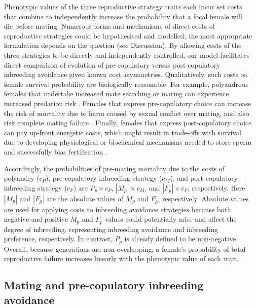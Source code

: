 \documentclass[12pt]{article}
\begin{document}
Phenotypic values of the three reproductive strategy traits each incur set costs that combine to independently increase the probability that a focal female will die before mating. Numerous forms and mechanisms of direct costs of reproductive strategies could be hypothesised and modelled; the most appropriate formulation depends on the question (see Discussion). By allowing costs of the three strategies to be directly and independently controlled, our model facilitates direct comparison of evolution of pre-copulatory versus post-copulatory inbreeding avoidance given known cost asymmetries. Qualitatively, such costs on female survival probability are biologically reasonable. For example, polyandrous females that undertake increased mate searching or mating can experience increased predation risk \cite[e.g.,][]{Rowe1988, Ronkainen1994, Koga1998}. Females that express pre-copulatory choice can increase the risk of mortality due to harm caused by sexual conflict over mating, and also risk complete mating failure \cite[which equates to pre-reproductive mortality in semelparous organisms;][]{Rowe1994, Kokko2013}. Finally, females that express post-copulatory choice can pay up-front energetic costs, which might result in trade-offs with survival due to developing physiological or biochemical mechanisms needed to store sperm and successfully bias fertilisation \cite[e.g.,][]{Gasparini2011, Tuni2013, Fitzpatrick2014a}.

Accordingly, the probabilities of pre-mating mortality due to the costs of polyandry ($c_{P}$), pre-copulatory inbreeding strategy ($c_{M}$), and post-copulatory inbreeding strategy ($c_{F}$) are $P_{p} \times c_{P}$, $|M_{p}| \times c_{M}$, and $|F_{p}| \times c_{F}$, respectively. Here $|M_{p}|$ and $|F_{p}|$ are the absolute values of $M_{p}$ and $F_{p}$, respectively. Absolute values are used for applying costs to inbreeding avoidance strategies because both negative and positive $M_{p}$ and $F_{p}$ values could potentially arise and affect the degree of inbreeding, representing inbreeding avoidance and inbreeding preference, respectively. In contrast, $P_{p}$ is already defined to be non-negative. Overall, because generations are non-overlapping, a female's probability of total reproductive failure increases linearly with the phenotypic value of each trait.

\subsection*{Mating and pre-copulatory inbreeding avoidance}
\end{document}
